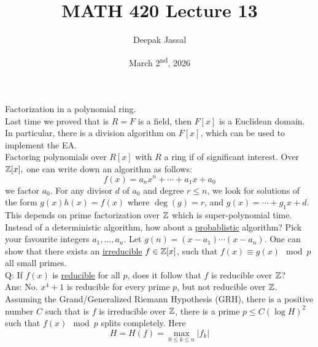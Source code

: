 \documentclass[12pt]{article}
\title{MATH 420 Lecture 13}
\author{Deepak Jassal}
\date{March 2\textsuperscript{nd}, 2026}
\begin{document}
\maketitle
Factorization in a polynomial ring.\\
Last time we proved that is $R=F$ is a field, then $F[x]$ is a Euclidean domain. In particular, there is a division algorithm on $F[x]$, which can be used to implement the EA. \\
Factoring polynomials over $R[x]$ with $R$ a ring if of significant interest. Over $\mathbb{Z}[x],$ one can write down an algorithm as follows:
\[
    f(x)=a_nx^n+\cdots+a_1x+a_0
\]
we factor $a_0$. For any divisor $d$ of $a_0$ and degree $r\leq n$, we look for solutions of the form $g(x)h(x)=f(x)$ where $\deg(g)=r$, and $g(x)=\cdots+g_1x+d$. This depends on prime factorization over $\mathbb{Z}$ which is super-polynomial time. Instead of a deterministic algorithm, how about a \underline{probablistic} algorithm? 
Pick your favourite integers $a_1,\dots,a_n$. Let $g(n)=(x-a_1)\cdots(x-a_n)$. One can show that there exists an \underline{irreducible} $f\in\mathbb{Z}[x]$, such that $f(x)\equiv g(x)\mod p$ all small primes.\\

Q: If $f(x)$ is \underline{reducible} for all $p$, does it follow that $f$ is reducible over $\mathbb{Z}$?\\
Ans: No. $x^4+1$ is reducible for every prime $p$, but not reducible over $\mathbb{Z}$.\\
Assuming the Grand/Generalized Riemann Hypothesis (GRH), there is a positive number $C$ such that is $f$ is irreducible over $\mathbb{Z}$, there is a prime $p\leq C(\log H)^2$ such that $f(x)\mod p$ splits completely. Here 
\[
    H=H(f)=\max_{0\leq k\leq n}|f_k|
\]
\end{document}
